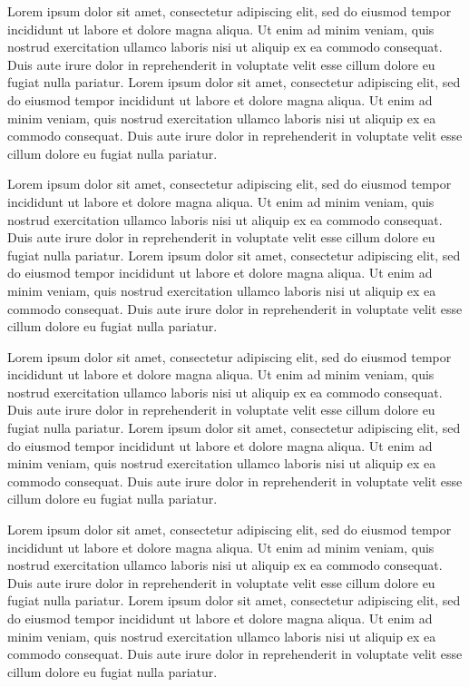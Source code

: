 \documentclass[11pt]{report}
\begin{document}
Lorem ipsum dolor sit amet, consectetur adipiscing elit, sed do eiusmod tempor incididunt ut labore et dolore magna aliqua. Ut enim ad minim veniam, quis nostrud exercitation ullamco laboris nisi ut aliquip ex ea commodo consequat. Duis aute irure dolor in reprehenderit in voluptate velit esse cillum dolore eu fugiat nulla pariatur. Lorem ipsum dolor sit amet, consectetur adipiscing elit, sed do eiusmod tempor incididunt ut labore et dolore magna aliqua. Ut enim ad minim veniam, quis nostrud exercitation ullamco laboris nisi ut aliquip ex ea commodo consequat. Duis aute irure dolor in reprehenderit in voluptate velit esse cillum dolore eu fugiat nulla pariatur.

Lorem ipsum dolor sit amet, consectetur adipiscing elit, sed do eiusmod tempor incididunt ut labore et dolore magna aliqua. Ut enim ad minim veniam, quis nostrud exercitation ullamco laboris nisi ut aliquip ex ea commodo consequat. Duis aute irure dolor in reprehenderit in voluptate velit esse cillum dolore eu fugiat nulla pariatur. Lorem ipsum dolor sit amet, consectetur adipiscing elit, sed do eiusmod tempor incididunt ut labore et dolore magna aliqua. Ut enim ad minim veniam, quis nostrud exercitation ullamco laboris nisi ut aliquip ex ea commodo consequat. Duis aute irure dolor in reprehenderit in voluptate velit esse cillum dolore eu fugiat nulla pariatur.

Lorem ipsum dolor sit amet, consectetur adipiscing elit, sed do eiusmod tempor incididunt ut labore et dolore magna aliqua. Ut enim ad minim veniam, quis nostrud exercitation ullamco laboris nisi ut aliquip ex ea commodo consequat. Duis aute irure dolor in reprehenderit in voluptate velit esse cillum dolore eu fugiat nulla pariatur. Lorem ipsum dolor sit amet, consectetur adipiscing elit, sed do eiusmod tempor incididunt ut labore et dolore magna aliqua. Ut enim ad minim veniam, quis nostrud exercitation ullamco laboris nisi ut aliquip ex ea commodo consequat. Duis aute irure dolor in reprehenderit in voluptate velit esse cillum dolore eu fugiat nulla pariatur.

Lorem ipsum dolor sit amet, consectetur adipiscing elit, sed do eiusmod tempor incididunt ut labore et dolore magna aliqua. Ut enim ad minim veniam, quis nostrud exercitation ullamco laboris nisi ut aliquip ex ea commodo consequat. Duis aute irure dolor in reprehenderit in voluptate velit esse cillum dolore eu fugiat nulla pariatur. Lorem ipsum dolor sit amet, consectetur adipiscing elit, sed do eiusmod tempor incididunt ut labore et dolore magna aliqua. Ut enim ad minim veniam, quis nostrud exercitation ullamco laboris nisi ut aliquip ex ea commodo consequat. Duis aute irure dolor in reprehenderit in voluptate velit esse cillum dolore eu fugiat nulla pariatur.
\end{document}
